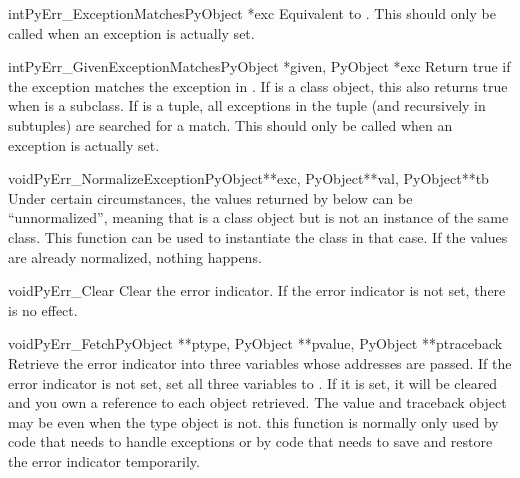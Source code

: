 \documentclass{manual}
\begin{document}
\begin{cfuncdesc}{int}{PyErr_ExceptionMatches}{PyObject *exc}
Equivalent to
.
This should only be called when an exception is actually set.
\end{cfuncdesc}

\begin{cfuncdesc}{int}{PyErr_GivenExceptionMatches}{PyObject *given, PyObject *exc}
Return true if the  exception matches the exception in
.  If  is a class object, this also returns true
when  is a subclass.  If  is a tuple, all
exceptions in the tuple (and recursively in subtuples) are searched
for a match.  This should only be called when an exception is actually
set.
\end{cfuncdesc}

\begin{cfuncdesc}{void}{PyErr_NormalizeException}{PyObject**exc, PyObject**val, PyObject**tb}
Under certain circumstances, the values returned by
 below can be ``unnormalized'', meaning that
 is a class object but  is not an
instance of the  same class.  This function can be used to instantiate
the class in that case.  If the values are already normalized, nothing
happens.
\end{cfuncdesc}

\begin{cfuncdesc}{void}{PyErr_Clear}{}
Clear the error indicator.  If the error indicator is not set, there
is no effect.
\end{cfuncdesc}

\begin{cfuncdesc}{void}{PyErr_Fetch}{PyObject **ptype, PyObject **pvalue, PyObject **ptraceback}
Retrieve the error indicator into three variables whose addresses are
passed.  If the error indicator is not set, set all three variables to
\NULL{}.  If it is set, it will be cleared and you own a reference to
each object retrieved.  The value and traceback object may be \NULL{}
even when the type object is not.   this function is
normally only used by code that needs to handle exceptions or by code
that needs to save and restore the error indicator temporarily.
\end{cfuncdesc}
\end{document}
